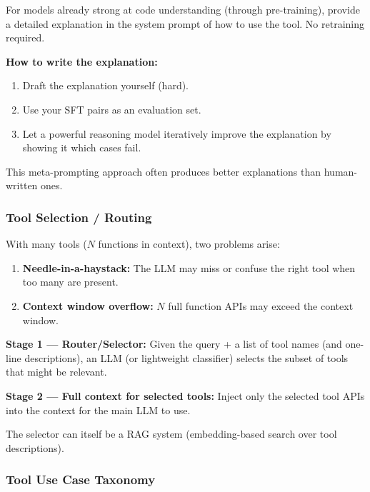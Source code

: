 \documentclass[11pt, a4paper]{article}
\begin{document}
\begin{defbox}
For models already strong at code understanding (through pre-training), provide a detailed explanation in the system prompt of how to use the tool. No retraining required.

\textbf{How to write the explanation:}
\begin{enumerate}[leftmargin=1.5em]
  \item Draft the explanation yourself (hard).
  \item Use your SFT pairs as an evaluation set.
  \item Let a powerful reasoning model iteratively improve the explanation by showing it which cases fail.
\end{enumerate}
This meta-prompting approach often produces better explanations than human-written ones.
\end{defbox}

\subsubsection{Tool Selection / Routing}

\begin{defbox}
With many tools ($N$ functions in context), two problems arise:
\begin{enumerate}[leftmargin=1.5em]
  \item \textbf{Needle-in-a-haystack:} The LLM may miss or confuse the right tool when too many are present.
  \item \textbf{Context window overflow:} $N$ full function APIs may exceed the context window.
\end{enumerate}
\end{defbox}

\begin{defbox}
\textbf{Stage 1 --- Router/Selector:}
Given the query + a list of tool names (and one-line descriptions), an LLM (or lightweight classifier) selects the subset of tools that might be relevant.

\textbf{Stage 2 --- Full context for selected tools:}
Inject only the selected tool APIs into the context for the main LLM to use.

The selector can itself be a RAG system (embedding-based search over tool descriptions).
\end{defbox}

\subsubsection{Tool Use Case Taxonomy}
\end{document}
